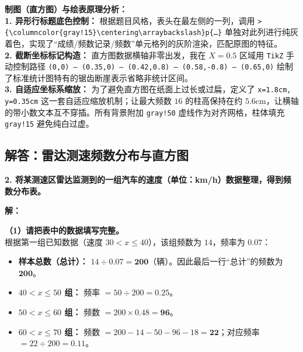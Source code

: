 {\small\color{blue!70!black}
\textbf{制图（直方图）与绘表原理分析：}\\
\textbf{1. 异形行标题底色控制：} 根据题目风格，表头在最左侧的一列，调用 \texttt{>\{\textbackslash columncolor\{gray!15\}\textbackslash centering\textbackslash arraybackslash\}p\{\dots\}} 单独对此列进行纯灰着色，实现了“成绩/频数记录/频数”单元格列的灰阶渲染，匹配原图的特征。\\
\textbf{2. 截断坐标标记构造：} 直方图数据横轴非零出发，我在 $X=0.5$ 区域用 \texttt{TikZ} 手动控制路径 \texttt{(0,0) -- (0.35,0) -- (0.42,0.8) -- (0.58,-0.8) -- (0.65,0)} 绘制了标准统计图特有的锯齿断崖表示省略非统计区间。\\
\textbf{3. 自适应坐标系缩放：} 为了避免直方图在纸面上过长或过扁，定义了 \texttt{x=1.8cm, y=0.35cm} 这一套自适应缩放机制；让最大频数 $16$ 的柱高保持在约 $5.6\text{cm}$，让横轴的带小数文本互不穿插。所有背景附加 \texttt{gray!50} 虚线作为对齐网格，柱体填充 \texttt{gray!15} 避免纯白过虚。
}

\newpage

\newpage

\subsection{解答：雷达测速频数分布与直方图}

\vspace{0.6cm}

\textbf{2. 将某测速区雷达监测到的一组汽车的速度（单位：km/h）数据整理，得到频数分布表。}

\vspace{0.4cm}

\textbf{解：}

\textbf{（1）请把表中的数据填写完整。} \\
根据第一组已知数据（速度 $30 < x \leqslant 40$），该组频数为 $14$，频率为 $0.07$：
\begin{itemize}
  \item \textbf{样本总数（总计）：} $14 \div 0.07 = \boldsymbol{200}$（辆）。因此最后一行“总计”的频数为 $\boldsymbol{200}$。
  \item \textbf{$40 < x \leqslant 50$ 组：} 频率 $= 50 \div 200 = \boldsymbol{0.25}$。
  \item \textbf{$50 < x \leqslant 60$ 组：} 频数 $= 200 \times 0.48 = \boldsymbol{96}$。
  \item \textbf{$60 < x \leqslant 70$ 组：} 频数 $= 200 - 14 - 50 - 96 - 18 = \boldsymbol{22}$；对应频率 $= 22 \div 200 = \boldsymbol{0.11}$。
\end{itemize}

